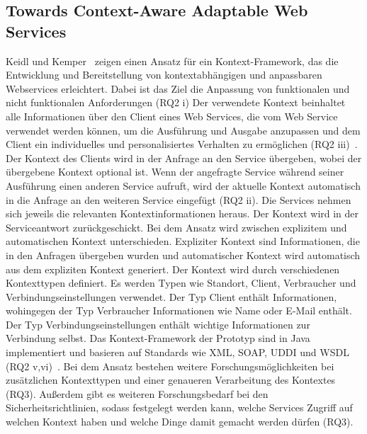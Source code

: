 \documentclass[conference,compsoc]{IEEEtran}
\begin{document}
\subsection{Towards Context-Aware Adaptable Web Services}
Keidl und Kemper~\cite{keidl2004towards} zeigen einen Ansatz für ein Kontext-Framework, das die Entwicklung und Bereitstellung von kontextabhängigen und anpassbaren Webservices erleichtert. Dabei ist das Ziel die Anpassung von funktionalen und nicht funktionalen Anforderungen (RQ2 i)
Der verwendete Kontext beinhaltet alle Informationen über den Client eines Web Services, die vom Web Service verwendet werden können, um die Ausführung und Ausgabe anzupassen und dem Client ein individuelles und personalisiertes Verhalten zu ermöglichen (RQ2 iii)~\cite{keidl2004towards}. Der Kontext des Clients wird in der Anfrage an den Service übergeben, wobei der übergebene Kontext optional ist. Wenn der angefragte Service während seiner Ausführung einen anderen Service aufruft, wird der aktuelle Kontext automatisch in die Anfrage an den weiteren Service eingefügt (RQ2 ii). Die Services nehmen sich jeweils die relevanten Kontextinformationen heraus. Der Kontext wird in der Serviceantwort zurückgeschickt.
Bei dem Ansatz wird zwischen explizitem und automatischen Kontext unterschieden. Expliziter Kontext sind Informationen, die in den Anfragen übergeben wurden und automatischer Kontext wird automatisch aus dem expliziten Kontext generiert.
Der Kontext wird durch verschiedenen Kontexttypen definiert. Es werden Typen wie Standort, Client, Verbraucher und Verbindungseinstellungen verwendet. Der Typ Client enthält Informationen, wohingegen der Typ Verbraucher Informationen wie Name oder E-Mail enthält. Der Typ Verbindungseinstellungen enthält wichtige Informationen zur Verbindung selbst.
Das Kontext-Framework der Prototyp sind in Java implementiert und basieren auf Standards wie XML, SOAP, UDDI und WSDL (RQ2 v,vi)~\cite{keidl2004towards}.
Bei dem Ansatz bestehen weitere Forschungsmöglichkeiten bei zusätzlichen Kontexttypen und einer genaueren Verarbeitung des Kontextes (RQ3). Außerdem gibt es weiteren Forschungsbedarf bei den Sicherheitsrichtlinien, sodass festgelegt werden kann, welche Services Zugriff auf welchen Kontext haben und welche Dinge damit gemacht werden dürfen (RQ3).
\end{document}
